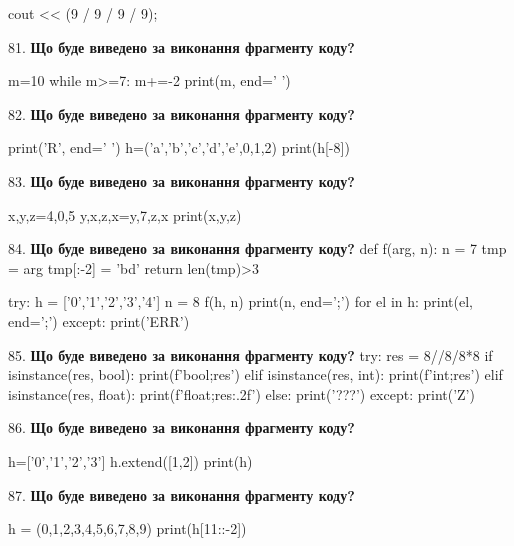 \documentclass[11pt]{article}
\begin{document}
cout << (9 / 9 / 9 / 9);
\par\vspace{5mm}
81. \textbf{Що буде виведено за виконання фрагменту коду?}

m=10
while m>=7:
    m+=-2
print(m, end=' ')

\par\vspace{5mm}
82. \textbf{Що буде виведено за виконання фрагменту коду?}

print('R', end=' ')
h=('a','b','c','d','e',0,1,2)
print(h[-8])

\par\vspace{5mm}
83. \textbf{Що буде виведено за виконання фрагменту коду?}

x,y,z=4,0,5
y,x,z,x=y,7,z,x
print(x,y,z)
\par\vspace{5mm}
84. \textbf{Що буде виведено за виконання фрагменту коду?}
def f(arg, n):
    n = 7
    tmp = arg
    tmp[:-2] = 'bd'
    return len(tmp)>3

try:
    h = ['0','1','2','3','4']
    n = 8
    f(h, n)
    print(n, end=';')
    for el in h:
        print(el, end=';')
except:
    print('ERR')
\par\vspace{5mm}
85. \textbf{Що буде виведено за виконання фрагменту коду?}
try:
    res = 8//8/8*8
    if isinstance(res, bool):
        print(f'bool;{res}')
    elif isinstance(res, int):
        print(f'int;{res}')
    elif isinstance(res, float):
        print(f'float;{res:.2f}')
    else:
        print('???')
except:
    print('Z')
\par\vspace{5mm}
86. \textbf{Що буде виведено за виконання фрагменту коду?}

h=['0','1','2','3']
h.extend([1,2])
print(h)

\par\vspace{5mm}
87. \textbf{Що буде виведено за виконання фрагменту коду?}

h = (0,1,2,3,4,5,6,7,8,9)
print(h[11::-2])
\end{document}
